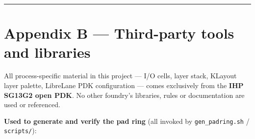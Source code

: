 \documentclass[
  11pt,
  a4paper,
]{article}
\begin{document}
\begin{center}\rule{0.5\linewidth}{0.5pt}\end{center}

\hypertarget{appendix-b-third-party-tools-and-libraries}{%
\section{Appendix B --- Third-party tools and
libraries}\label{appendix-b-third-party-tools-and-libraries}}

All process-specific material in this project --- I/O cells, layer
stack, KLayout layer palette, LibreLane PDK configuration --- comes
exclusively from the \textbf{IHP SG13G2 open PDK}. No other foundry's
libraries, rules or documentation are used or referenced.

\textbf{Used to generate and verify the pad ring} (all invoked by
\texttt{gen\_padring.sh} / \texttt{scripts/}):
\end{document}
